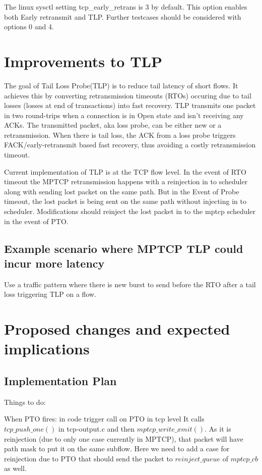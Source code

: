 \documentclass[12pt,draftcls,onecolumn]{IEEEtran}
\begin{document}
The linux sysctl setting tcp\_early\_retrans is 3 by default. This option enables both Early retransmit and TLP. 
Further testcases should be considered with options 0 and 4. 

\section{Improvements to TLP}
The goal of Tail Loss Probe(TLP) is to reduce tail latency of short flows. It achieves this by converting retransmission timeouts (RTOs) occuring due to tail losses (losses at end of transactions) into fast recovery. TLP transmits one packet in two round-trips when a connection is in Open state and isn't receiving any ACKs. The transmitted packet, aka loss probe, can be either new or a retransmission. When there is tail loss, the ACK from a loss probe triggers FACK/early-retransmit based fast recovery, thus avoiding a costly retransmission timeout.

Current implementation of TLP is at the TCP flow level. In the event of RTO timeout the MPTCP retransmission happens with a reinjection in to scheduler along with sending lost packet on the same path. But in the Event of Probe timeout, the lost packet is being sent on the same path without injecting in to scheduler.  Modifications should reinject the lost packet in to the mptcp scheduler in the event of PTO.

\subsection{Example scenario where MPTCP TLP could incur more latency}

Use a traffic pattern where there is new burst to send before the RTO after a tail loss triggering TLP on a flow.


\section{Proposed changes and expected implications}


\subsection{Implementation Plan}

Things to do:



When PTO fires: in code trigger call on PTO in tcp level
It calls ${tcp\_push\_one()}$ in tcp-output.c and then ${mptcp\_write\_xmit()}$.
As it is reinjection (due to only one case currently in MPTCP), that packet will have path mask
to put it on the same subflow. Here we need to add a case for reinjection due to PTO that should
send the packet to $reinject\_queue$ of ${mptcp\_cb}$ as well.
\end{document}
